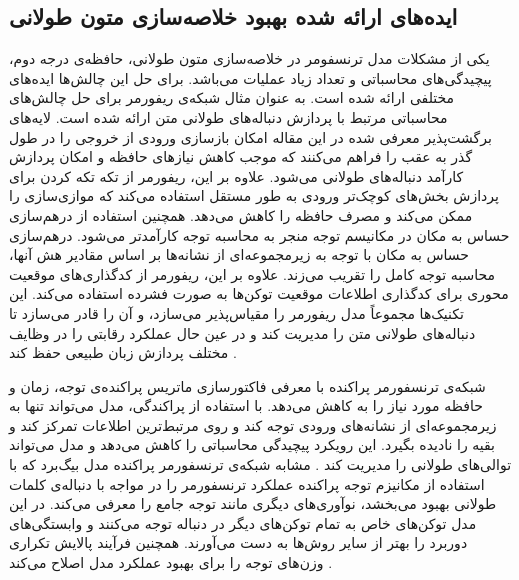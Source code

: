 


\subsection{ایده‌های ارائه شده بهبود خلاصه‌سازی متون طولانی }


یکی از مشکلات مدل ترنسفومر در خلاصه‌سازی متون طولانی، حافظه‌ی درجه دوم، پیچیدگی‌های محاسباتی و تعداد زیاد عملیات می‌باشد. برای حل این چالش‌ها ایده‌های مختلفی ارائه شده است. به عنوان مثال شبکه‌ی ریفورمر
برای حل چالش‌های محاسباتی مرتبط با پردازش دنباله‌های طولانی متن ارائه شده است. لایه‌های برگشت‌پذیر
معرفی شده در این مقاله امکان بازسازی ورودی از خروجی را در طول گذر به عقب را فراهم می‌کنند که موجب  کاهش نیازهای حافظه و امکان پردازش کارآمد دنباله‌های طولانی  می‌شود.
علاوه بر این، ریفورمر از تکه تکه کردن برای پردازش بخش‌های کوچک‌تر ورودی به طور مستقل استفاده می‌کند که موازی‌سازی را ممکن می‌کند و مصرف حافظه را کاهش می‌دهد. همچنین استفاده از درهم‌سازی حساس به مکان 
 در مکانیسم توجه منجر به محاسبه توجه کارآمدتر می‌شود. درهم‌سازی حساس به مکان با توجه به زیرمجموعه‌ای از نشانه‌ها بر اساس مقادیر هش آنها، محاسبه توجه کامل را تقریب می‌زند. علاوه بر این، ریفورمر از کدگذاری‌های موقعیت محوری برای کدگذاری اطلاعات موقعیت توکن‌ها به صورت فشرده استفاده می‌کند. این تکنیک‌ها مجموعاً مدل ریفورمر را  مقیاس‌پذیر می‌سازد، و آن را قادر می‌سازد تا دنباله‌های طولانی متن را مدیریت کند و در عین حال عملکرد رقابتی را در وظایف مختلف پردازش زبان طبیعی حفظ کند \cite{reformer}.

 شبکه‌ی ترنسفورمر پراکنده
با معرفی فاکتورسازی‌ ماتریس پراکنده‌ی توجه، زمان و حافظه مورد نیاز را به کاهش می‌دهد.
با استفاده از پراکندگی، مدل می‌تواند تنها به زیرمجموعه‌ای از نشانه‌های ورودی توجه کند و روی مرتبط‌ترین اطلاعات تمرکز کند و بقیه را نادیده بگیرد. این رویکرد پیچیدگی محاسباتی را کاهش می‌دهد و مدل می‌تواند توالی‌های طولانی‌ را مدیریت کند \cite{child2019generating}.
 مشابه شبکه‌ی ترنسفورمر پراکنده مدل بیگ‌برد که
با استفاده از مکانیزم توجه پراکنده
 عملکرد ترنسفورمر را در مواجه با دنباله‌ی کلمات
طولانی بهبود می‌بخشد، نوآوری‌های دیگری مانند توجه جامع
را معرفی می‌کند. در این مدل توکن‌های خاص به تمام توکن‌های دیگر در دنباله توجه می‌کنند و وابستگی‌های دوربرد را بهتر از سایر روش‌ها به دست می‌آورند. همچنین  فرآیند پالایش تکراری  وزن‌های توجه را برای بهبود عملکرد مدل اصلاح می‌کند \cite{zaheer2020big}. 


